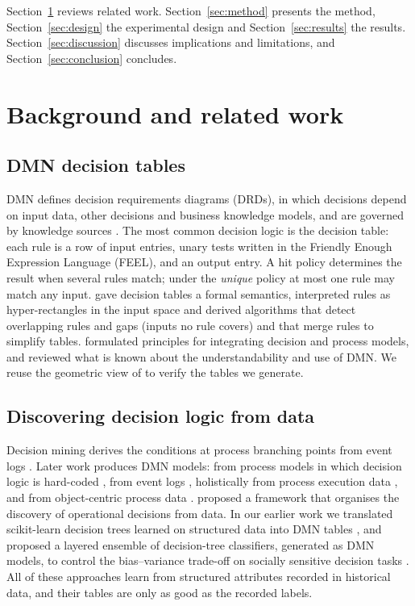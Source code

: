 \documentclass[a4paper,fleqn]{cas-sc}
\theoremstyle{definition}
\begin{document}
Section~\ref{sec:related} reviews related work. Section~\ref{sec:method} presents the method, Section~\ref{sec:design} the experimental design and Section~\ref{sec:results} the results. Section~\ref{sec:discussion} discusses implications and limitations, and Section~\ref{sec:conclusion} concludes.

\section{Background and related work}\label{sec:related}

\subsection{DMN decision tables}
DMN defines decision requirements diagrams (DRDs), in which decisions depend on input data, other decisions and business knowledge models, and are governed by knowledge sources \citep{omg_dmn13}. The most common decision logic is the decision table: each rule is a row of input entries, unary tests written in the Friendly Enough Expression Language (FEEL), and an output entry. A hit policy determines the result when several rules match; under the \emph{unique} policy at most one rule may match any input. \citet{calvanese2016,calvanese2018} gave decision tables a formal semantics, interpreted rules as hyper-rectangles in the input space and derived algorithms that detect overlapping rules and gaps (inputs no rule covers) and that merge rules to simplify tables. \citet{hasic2018} formulated principles for integrating decision and process models, and \citet{figl2018} reviewed what is known about the understandability and use of DMN. We reuse the geometric view of \citet{calvanese2018} to verify the tables we generate.

\subsection{Discovering decision logic from data}
Decision mining derives the conditions at process branching points from event logs \citep{rozinat2006,deleoni2013}. Later work produces DMN models: from process models in which decision logic is hard-coded \citep{batoulis2015}, from event logs \citep{bazhenova2016}, holistically from process execution data \citep{desmedt2019}, and from object-centric process data \citep{goossens2024}. \citet{leewis2024} proposed a framework that organises the discovery of operational decisions from data. In our earlier work we translated scikit-learn decision trees learned on structured data into DMN tables \citep{etinger2019}, and proposed a layered ensemble of decision-tree classifiers, generated as DMN models, to control the bias--variance trade-off on socially sensitive decision tasks \citep{simic2020}. All of these approaches learn from structured attributes recorded in historical data, and their tables are only as good as the recorded labels.
\end{document}

